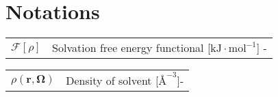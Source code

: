 {}
\setcounter{tocdepth}{2} %
\setcounter{secnumdepth}{3} %
\manualmark 
\markboth{\spacedlowsmallcaps{\contentsname}}{\spacedlowsmallcaps{\contentsname}} 
\tableofcontents  
{} 
\renewcommand{\chaptermark}[1]{\markboth{\spacedlowsmallcaps{#1}}{\spacedlowsmallcaps{#1}}} \renewcommand{\sectionmark}[1]{\markright{\thesection\enspace\spacedlowsmallcaps{#1}}} 

\clearpage{}

\begingroup
\let\clearpage\relax
\let\cleardoublepage\relax

{}
\listoffigures

\vspace{8ex}

{}
\listoftables

\vspace{8ex}

{}
\chapter*{Notations} 

\hspace{-0.5em}%
\begin{tabular}{>{\raggedright}p{3.3em}l}
$\mathcal{F}[\rho]$ & Solvation free energy functional {[}$\mathrm{kJ\cdot mol^{-1}}${]}
-\tabularnewline
\end{tabular}

\hspace{-1.5em}%
\begin{tabular}{>{\raggedright}p{3.3em}l}
$\rho(\mathbf{r},\mathbf{\Omega})$ & Density of solvent {[}$\textrm{\AA}^{-3}${]}-\tabularnewline
\end{tabular}

